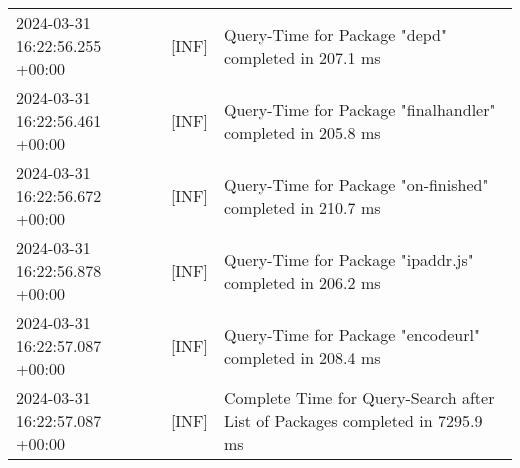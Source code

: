 {{\begin{tabularx}{\textwidth}{|l|l|X|}
                    2024-03-31 16:22:56.255 +00:00 & [INF] & Query-Time for Package "depd" completed in 207.1 ms \\
                    2024-03-31 16:22:56.461 +00:00 & [INF] & Query-Time for Package "finalhandler" completed in 205.8 ms \\
                    2024-03-31 16:22:56.672 +00:00 & [INF] & Query-Time for Package "on-finished" completed in 210.7 ms \\
                    2024-03-31 16:22:56.878 +00:00 & [INF] & Query-Time for Package "ipaddr.js" completed in 206.2 ms \\
                    2024-03-31 16:22:57.087 +00:00 & [INF] & Query-Time for Package "encodeurl" completed in 208.4 ms \\
                    2024-03-31 16:22:57.087 +00:00 & [INF] & Complete Time for Query-Search after List of Packages completed in 7295.9 ms \\
                    \hline
                \end{tabularx}
            }
        }

